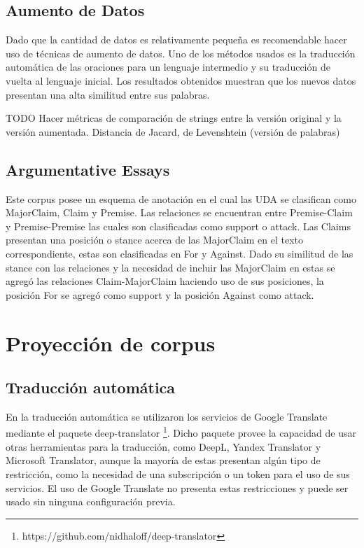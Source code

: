 \subsection{Aumento de Datos}

Dado que la cantidad de datos es relativamente pequeña es recomendable hacer uso de técnicas de 
aumento de datos. Uno de los métodos usados es la traducción automática de las oraciones para 
un lenguaje intermedio y su traducción de vuelta al lenguaje inicial. Los resultados obtenidos
muestran que los nuevos datos presentan una alta similitud entre sus palabras.

TODO Hacer métricas de comparación de strings entre la versión original y la versión aumentada.
Distancia de Jacard, de Levenshtein (versión de palabras)


\cite{feng2021data}

\subsection{Argumentative Essays}

Este corpus posee un esquema de anotación en el cual las UDA se clasifican como MajorClaim, Claim y 
Premise. Las relaciones se encuentran entre Premise-Claim y Premise-Premise las cuales son clasificadas
como support o attack. Las Claims presentan una posición o stance acerca de las MajorClaim en el 
texto correspondiente, estas son clasificadas en For y Against. Dado su similitud de las stance con
las relaciones y la necesidad de incluir las MajorClaim en estas se agregó las relaciones Claim-MajorClaim
haciendo uso de sus posiciones, la posición For se agregó como support y la posición Against como attack.

\section{Proyección de corpus}

\subsection{Traducción automática}

En la traducción automática se utilizaron los servicios de Google Translate mediante el paquete
deep-translator \footnote{https://github.com/nidhaloff/deep-translator}. Dicho paquete provee la capacidad de usar 
otras herramientas para la traducción, como DeepL, Yandex Translator y Microsoft Translator,
aunque la mayoría de estas presentan algún tipo de restricción, como la necesidad de una subscripción
o un token para el uso de sus servicios. El uso de Google Translate no presenta estas restricciones
y puede ser usado sin ninguna configuración previa.

